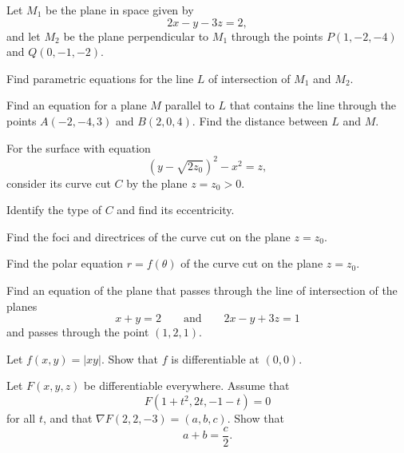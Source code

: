 \begin{problem}
Let $M_1$ be the plane in space given by
\[
2x-y-3z=2,
\]
and let $M_2$ be the plane perpendicular to $M_1$ through the points $P(1,-2,-4)$ and $Q(0,-1,-2)$.
\begin{problemsubparts}
\item Find parametric equations for the line $L$ of intersection of $M_1$ and $M_2$.
\item Find an equation for a plane $M$ parallel to $L$ that contains the line through the points $A(-2,-4,3)$ and $B(2,0,4)$. Find the distance between $L$ and $M$.
\end{problemsubparts}
\end{problem}

\begin{problem}
For the surface with equation
\[
(y-\sqrt{2z_0})^2-x^2=z,
\]
consider its curve cut $C$ by the plane $z=z_0>0$.
\begin{problemsubparts}
\item Identify the type of $C$ and find its eccentricity.
\item Find the foci and directrices of the curve cut on the plane $z=z_0$.
\item Find the polar equation $r=f(\theta)$ of the curve cut on the plane $z=z_0$.
\end{problemsubparts}
\end{problem}


\begin{problem}
Find an equation of the plane that passes through the line of intersection of the planes
\[
x+y=2
\qquad\text{and}\qquad
2x-y+3z=1
\]
and passes through the point $(1,2,1)$.
\end{problem}

\begin{problem}
Let $f(x,y)=|xy|$. Show that $f$ is differentiable at $(0,0)$.
\end{problem}

\begin{problem}
Let $F(x,y,z)$ be differentiable everywhere. Assume that
\[
F(1+t^2,2t,-1-t)=0
\]
for all $t$, and that $\nabla F(2,2,-3)=(a,b,c)$. Show that
\[
a+b=\frac{c}{2}.
\]
\end{problem}


